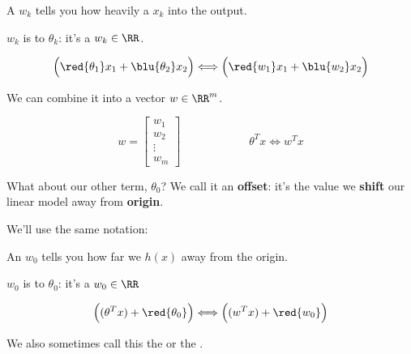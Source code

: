         \begin{notation}
            A  $w_k$ tells you how heavily a  $x_k$  into the output.
            
            $w_k$ is  to $\theta_k$: it's a  $w_k \in \RR$.
            
            \begin{equation*}
                \Big( 
                    \red{\theta_1}x_1 + \blu{\theta_2}x_2 
                \Big)
                \Longleftrightarrow 
                \Big(
                    \red{w_1}x_1+\blu{w_2}x_2
                \Big)
            \end{equation*}
            
            We can combine it into a vector $w \in \RR^m$.
            
            \begin{equation*}
                w = 
                    \begin{bmatrix}
                      w_1 \\ w_2 \\ \vdots \\ w_m
                    \end{bmatrix}
                \qquad \qquad \qquad
                \theta^Tx \Longleftrightarrow w^Tx
            \end{equation*}
        \end{notation}
        
        
        
        What about our other term, $\theta_0$? We call it an \textbf{offset}: it's the value we \textbf{shift} our linear model away from \textbf{origin}.
        
        We'll use the same notation:\\
        
        \begin{notation}
            An  $w_0$ tells you how far we  $h(x)$ away from the origin. 
            
            $w_0$ is  to $\theta_0$: it's a  $w_0 \in \RR$
            
            \begin{equation*}
                \Big(
                    (\theta^Tx) + \red{\theta_0} 
                \Big)
                \Longleftrightarrow 
                \Big(
                    (w^Tx) + \red{w_0}
                \Big)
            \end{equation*}
            
            We also sometimes call this the  or the .
        \end{notation}
        
